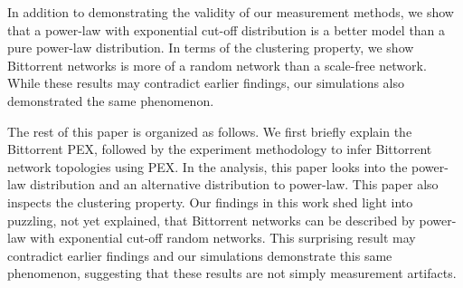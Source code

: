 \documentclass[paper]{ieice}
\begin{document}

In addition to demonstrating the validity of our measurement methods, we show that a power-law with exponential cut-off distribution is a better model than a pure power-law distribution. 
In terms of the clustering property, we show Bittorrent networks is more of a random network than a scale-free network. 
While these results may contradict earlier findings, our simulations also demonstrated the same phenomenon.

The rest of this paper is organized as follows. We first briefly explain the Bittorrent PEX, followed by the experiment methodology to infer Bittorrent network topologies using PEX. 
In the analysis, this paper looks into the power-law distribution and an alternative distribution to power-law. 
This paper also inspects the clustering property.
Our findings in this work shed light into puzzling, not yet explained, that  Bittorrent networks can be described by power-law with exponential cut-off random networks.
This surprising result may contradict earlier findings and our simulations demonstrate this same phenomenon, suggesting that these results are not simply measurement artifacts.
\end{document}
